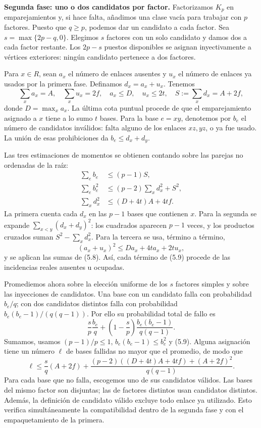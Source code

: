 \documentclass[spanish,11pt,a4paper]{article}
\begin{document}
\textbf{Segunda fase: uno o dos candidatos por factor.} Factorizamos \(K_p\) en emparejamientos y, si hace falta, añadimos una clase vacía para trabajar con \(p\) factores. Puesto que \(q\ge p\), podemos dar un candidato a cada factor. Sea \(s=\max\{2p-q,0\}\). Elegimos \(s\) factores con un solo candidato y damos dos a cada factor restante. Los \(2p-s\) puestos disponibles se asignan inyectivamente a vértices exteriores: ningún candidato pertenece a dos factores.

Para \(x\in R\), sean \(a_x\) el número de enlaces ausentes y \(u_x\) el número de enlaces ya usados por la primera fase. Definamos \(d_x=a_x+u_x\). Tenemos \[
\sum_xa_x=A,\quad \sum_xu_x=2f,\quad
a_x\le D,\quad u_x\le2t,\quad
S:=\sum_xd_x=A+2f,
\tag{5.8}
\] donde \(D=\max_xa_x\). La última cota puntual procede de que el emparejamiento asignado a \(x\) tiene a lo sumo \(t\) bases. Para la base \(e=xy\), denotemos por \(b_e\) el número de candidatos inválidos: falta alguno de los enlaces \(xz,yz\), o ya fue usado. La unión de esas prohibiciones da \(b_e\le d_x+d_y\).

Las tres estimaciones de momentos se obtienen contando sobre las parejas no ordenadas de la raíz: \[
\begin{aligned}
\sum_e b_e&\le(p-1)S,\\
\sum_e b_e^2&\le(p-2)\sum_xd_x^2+S^2,\\
\sum_xd_x^2&\le(D+4t)A+4tf.
\end{aligned}
\tag{5.9}
\] La primera cuenta cada \(d_x\) en las \(p-1\) bases que contienen \(x\). Para la segunda se expande \(\sum_{x<y}(d_x+d_y)^2\): los cuadrados aparecen \(p-1\) veces, y los productos cruzados suman \(S^2-\sum_xd_x^2\). Para la tercera se usa, término a término, \[
(a_x+u_x)^2\le Da_x+4ta_x+2tu_x,
\] y se aplican las sumas de (5.8). Así, cada término de (5.9) procede de las incidencias reales ausentes u ocupadas.

Promediemos ahora sobre la elección uniforme de los \(s\) factores simples y sobre las inyecciones de candidatos. Una base con un candidato falla con probabilidad \(b_e/q\); con dos candidatos distintos falla con probabilidad \(b_e(b_e-1)/(q(q-1))\). Por ello su probabilidad total de fallo es \[
\frac{s}{p}\frac{b_e}{q}
+\left(1-\frac{s}{p}\right)\frac{b_e(b_e-1)}{q(q-1)}.
\tag{5.10}
\] Sumamos, usamos \((p-1)/p\le1\), \(b_e(b_e-1)\le b_e^2\) y (5.9). Alguna asignación tiene un número \(\ell\) de bases fallidas no mayor que el promedio, de modo que \[
\ell\le\frac{s}{q}(A+2f)
+\frac{(p-2)((D+4t)A+4tf)+(A+2f)^2}{q(q-1)}.
\tag{5.11}
\] Para cada base que no falla, escogemos uno de sus candidatos válidos. Las bases del mismo factor son disjuntas; las de factores distintos usan candidatos distintos. Además, la definición de candidato válido excluye todo enlace ya utilizado. Esto verifica simultáneamente la compatibilidad dentro de la segunda fase y con el empaquetamiento de la primera.
\end{document}
